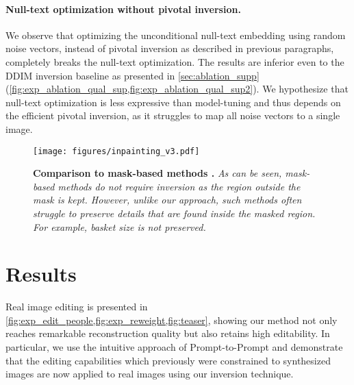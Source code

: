 \paragraph{Null-text optimization without pivotal inversion.}
We observe that optimizing the unconditional null-text embedding using random noise vectors, instead of pivotal inversion as described in previous paragraphs, completely breaks the null-text optimization. The results are inferior even to the DDIM inversion baseline as presented in \cref{sec:ablation_supp} (\cref{fig:exp_ablation_qual_sup,fig:exp_ablation_qual_sup2}). We hypothesize that null-text optimization is less expressive than model-tuning and thus depends on the efficient pivotal inversion, as it struggles to map all noise vectors to a single image. 




\begin{figure}
\centering 
\vspace{-0.5cm}
\texttt{[image: figures/inpainting\_v3.pdf]} 

\vspace{-0.2cm}
\caption{{\bf Comparison to mask-based methods .} {\it As can be seen, mask-based methods do not require inversion as the region outside the mask is kept. However, unlike our approach, such methods often struggle to preserve details that are found inside the masked region. For example, basket size is not preserved. } } 
\vspace{-0.4cm}
\label{fig:exp_inaint} 

\end{figure} 

\section{Results}
\label{sec:results}



Real image editing is presented in \cref{fig:exp_edit_people,fig:exp_reweight,fig:teaser}, showing our method not only reaches remarkable reconstruction quality but also retains high editability. In particular, we use the intuitive approach of Prompt-to-Prompt \cite{hertz2022prompt} and demonstrate that the editing capabilities which previously were constrained to synthesized images are now applied to real images using our inversion technique.



